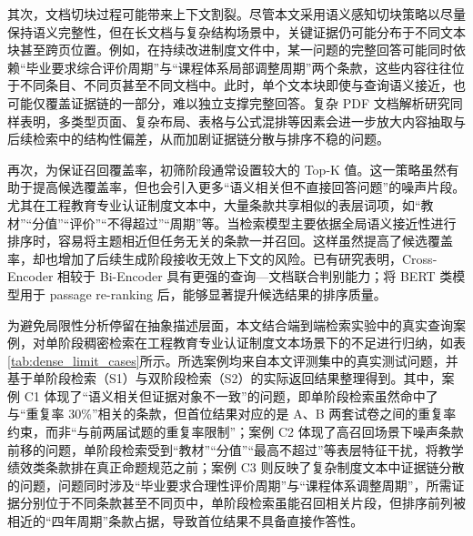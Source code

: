 \documentclass[UTF8,a4paper,zihao=-4]{ctexart}
\begin{document}
其次，文档切块过程可能带来上下文割裂。尽管本文采用语义感知切块策略以尽量保持语义完整性，但在长文档与复杂结构场景中，关键证据仍可能分布于不同文本块甚至跨页位置。例如，在持续改进制度文件中，某一问题的完整回答可能同时依赖“毕业要求综合评价周期”与“课程体系局部调整周期”两个条款，这些内容往往位于不同条目、不同页甚至不同文档中。此时，单个文本块即使与查询语义接近，也可能仅覆盖证据链的一部分，难以独立支撑完整回答。复杂 PDF 文档解析研究同样表明，多类型页面、复杂布局、表格与公式混排等因素会进一步放大内容抽取与后续检索中的结构性偏差，从而加剧证据链分散与排序不稳的问题\cite{ouyang2024omnidocbenchbenchmarkingdiversepdf}。

再次，为保证召回覆盖率，初筛阶段通常设置较大的 Top-K 值。这一策略虽然有助于提高候选覆盖率，但也会引入更多“语义相关但不直接回答问题”的噪声片段。尤其在工程教育专业认证制度文本中，大量条款共享相似的表层词项，如“教材”“分值”“评价”“不得超过”“周期”等。当检索模型主要依据全局语义接近性进行排序时，容易将主题相近但任务无关的条款一并召回。这样虽然提高了候选覆盖率，却也增加了后续生成阶段接收无效上下文的风险。已有研究表明，Cross-Encoder 相较于 Bi-Encoder 具有更强的查询—文档联合判别能力；将 BERT 类模型用于 passage re-ranking 后，能够显著提升候选结果的排序质量\cite{Humeau2020Poly-encoders:,nogueira2020passagererankingbert}。

为避免局限性分析停留在抽象描述层面，本文结合端到端检索实验中的真实查询案例，对单阶段稠密检索在工程教育专业认证制度文本场景下的不足进行归纳，如表\ref{tab:dense_limit_cases}所示。所选案例均来自本文评测集中的真实测试问题，并基于单阶段检索（S1）与双阶段检索（S2）的实际返回结果整理得到。其中，案例 C1 体现了“语义相关但证据对象不一致”的问题，即单阶段检索虽然命中了与“重复率 30\%”相关的条款，但首位结果对应的是 A、B 两套试卷之间的重复率约束，而非“与前两届试题的重复率限制”；案例 C2 体现了高召回场景下噪声条款前移的问题，单阶段检索受到“教材”“分值”“最高不超过”等表层特征干扰，将教学绩效类条款排在真正命题规范之前；案例 C3 则反映了复杂制度文本中证据链分散的问题，问题同时涉及“毕业要求合理性评价周期”与“课程体系调整周期”，所需证据分别位于不同条款甚至不同页中，单阶段检索虽能召回相关片段，但排序前列被相近的“四年周期”条款占据，导致首位结果不具备直接作答性。
\end{document}
